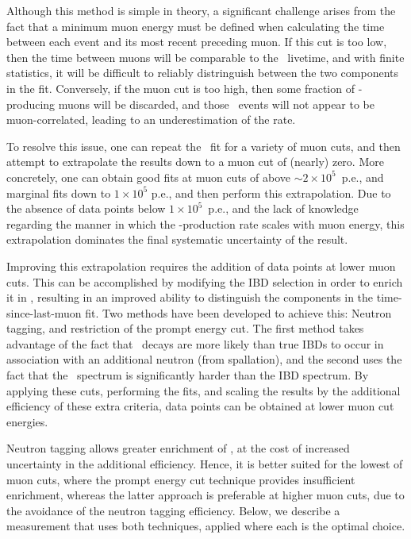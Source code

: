 \documentclass[../thesis.tex]{subfiles}
\begin{document}
Although this method is simple in theory, a significant challenge arises from
the fact that a minimum muon energy must be defined when calculating the time
between each event and its most recent preceding muon. If this cut is too low,
then the time between muons will be comparable to the \linine\ livetime, and
with finite statistics, it will be difficult to reliably distringuish between
the two components in the fit. Conversely, if the muon cut is too high, then
some fraction of \linine-producing muons will be discarded, and those \linine\
events will not appear to be muon-correlated, leading to an underestimation of
the rate.

To resolve this issue, one can repeat the \linine\ fit for a variety of muon
cuts, and then attempt to extrapolate the results down to a muon cut of (nearly)
zero. More concretely, one can obtain good fits at muon cuts of above $\sim
2\times10^5$~p.e., and marginal fits down to $1\times10^5$ p.e., and then
perform this extrapolation. Due to the absence of data points below
$1\times10^5$~p.e., and the lack of knowledge regarding the manner in which the
\linine-production rate scales with muon energy, this extrapolation dominates
the final systematic uncertainty of the result.

Improving this extrapolation requires the addition of data points at lower muon
cuts. This can be accomplished by modifying the IBD selection in order to enrich
it in \linine, resulting in an improved ability to distinguish the components in
the time-since-last-muon fit. Two methods have been developed to achieve this:
Neutron tagging, and restriction of the prompt energy cut. The first method
takes advantage of the fact that \linine\ decays are more likely than true IBDs
to occur in association with an additional neutron (from spallation), and the
second uses the fact that the \linine\ spectrum is significantly harder than the
IBD spectrum. By applying these cuts, performing the fits, and scaling the
results by the additional efficiency of these extra criteria, data points can be
obtained at lower muon cut energies.

Neutron tagging allows greater enrichment of \linine, at the cost of increased
uncertainty in the additional efficiency. Hence, it is better suited for the
lowest of muon cuts, where the prompt energy cut technique provides insufficient
enrichment, whereas the latter approach is preferable at higher muon cuts, due
to the avoidance of the neutron tagging efficiency. Below, we describe a
measurement that uses both techniques, applied where each is the optimal choice.
\end{document}
